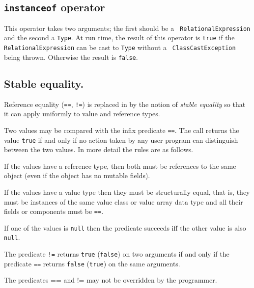 \subsection{{\tt instanceof} operator}\label{instanceOf}

This operator takes two arguments; the first should be a {\tt
RelationalExpression} and the second a {\tt Type}. At run time, the
result of this operator is {\tt true} if the {\tt
RelationalExpression} can be cast to {\tt Type} without a {\tt
ClassCastException} being thrown. Otherwise the result is {\tt false}.

\subsection{Stable equality.}\label{StableEquality}\index{==}\index{!=}

\cbstart
Reference equality ({\tt ==}, {\tt !=}) is replaced in \Xten{} by the
notion of {\em stable equality} so that it can apply uniformly to value and
reference types.

Two values may be compared with the infix predicate {\tt ==}. The call
returns the value {\tt true} if and only if no action taken by any
user program can distinguish between the two values.  In more detail
the rules are as follows.

If the values have a reference type, then both must be references to
the same object (even if the object has no mutable fields). 

If the values have a value type then they must be structurally equal,
that is, they must be instances of the same value class or value array
data type and all their fields or components must be {\tt ==}. 

If one of the values is {\tt null} then the predicate succeeds iff the
other value is also {\tt null}.

The predicate {\tt !=} returns {\tt true} ({\tt false}) on two
arguments if and only if the predicate {\tt ==} returns {\tt false}
({\tt true}) on the same arguments.

The predicates {\cf ==} and {\cf !=} may not be overridden by the
programmer.

\cbend
